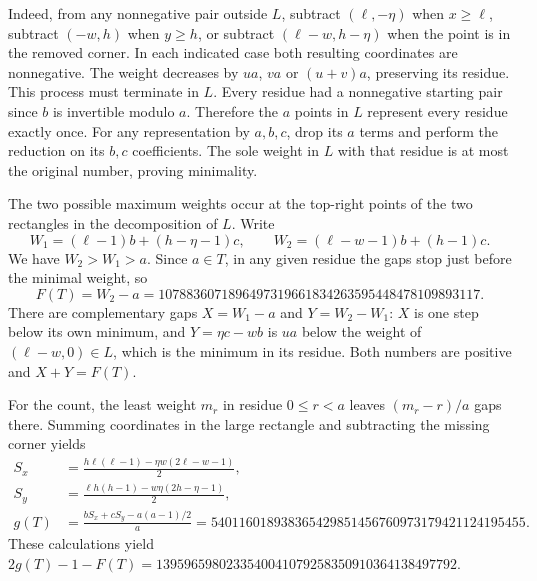 \documentclass[11pt,a4paper]{article}
\begin{document}
Indeed, from any nonnegative pair outside $L$, subtract $(\ell,-\eta)$ when $x\ge\ell$, subtract $(-w,h)$ when $y\ge h$, or subtract $(\ell-w,h-\eta)$ when the point is in the removed corner. In each indicated case both resulting coordinates are nonnegative. The weight decreases by $ua$, $va$ or $(u+v)a$, preserving its residue. This process must terminate in $L$. Every residue had a nonnegative starting pair since $b$ is invertible modulo $a$. Therefore the $a$ points in $L$ represent every residue exactly once. For any representation by $a,b,c$, drop its $a$ terms and perform the reduction on its $b,c$ coefficients. The sole weight in $L$ with that residue is at most the original number, proving minimality.

The two possible maximum weights occur at the top-right points of the two rectangles in the decomposition of $L$. Write
\[
W_1=(\ell-1)b+(h-\eta-1)c,\qquad W_2=(\ell-w-1)b+(h-1)c.
\]
We have $W_2>W_1>a$. Since $a\in T$, in any given residue the gaps stop just before the minimal weight, so
\[
F(T)=W_2-a=1078836071896497319661834263595448478109893117.
\]
There are complementary gaps $X=W_1-a$ and $Y=W_2-W_1$: $X$ is one step below its own minimum, and $Y=\eta c-wb$ is $ua$ below the weight of $(\ell-w,0)\in L$, which is the minimum in its residue. Both numbers are positive and $X+Y=F(T)$.

For the count, the least weight $m_r$ in residue $0\le r<a$ leaves $(m_r-r)/a$ gaps there. Summing coordinates in the large rectangle and subtracting the missing corner yields
\begin{align*}
S_x&=\frac{h\ell(\ell-1)-\eta w(2\ell-w-1)}2,\\
S_y&=\frac{\ell h(h-1)-w\eta(2h-\eta-1)}2,\\
g(T)&=\frac{bS_x+cS_y-a(a-1)/2}{a}
=540116018938365429851456760973179421124195455.
\end{align*}
These calculations yield $2g(T)-1-F(T)=1395965980233540041079258350910364138497792$.
\end{document}

